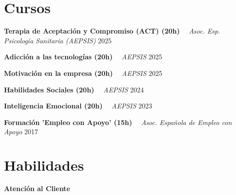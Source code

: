 \documentclass[letterpaper,11pt]{article}
\begin{document}
\section{Cursos}
    \noindent
    \begin{minipage}[t]{1.0\linewidth}
        {\textbf{Terapia de Aceptación y Compromiso (ACT) (20h)}} 
        \ \textendash \ 
        {\color{detailgray}\textit{Asoc. Esp. Psicología Sanitaria (AEPSIS)}}
        \hfill 
        {\small 2025}
    \end{minipage}
    \par 
    \vspace{0.1cm} 
    \noindent
    \begin{minipage}[t]{1.0\linewidth}
        {\textbf{Adicción a las tecnologías (20h)}} 
        \ \textendash \ 
        {\color{detailgray}\textit{AEPSIS}}
        \hfill 
        {\small 2025}
    \end{minipage}
    \par 
    \vspace{0.1cm} 
    \noindent
    \begin{minipage}[t]{1.0\linewidth}
        {\textbf{Motivación en la empresa (20h)}} 
        \ \textendash \ 
        {\color{detailgray}\textit{AEPSIS}}
        \hfill 
        {\small 2025}
    \end{minipage}
    \par 
    \vspace{0.1cm} 
    \noindent
    \begin{minipage}[t]{1.0\linewidth}
        {\textbf{Habilidades Sociales (20h)}} 
        \ \textendash \ 
        {\color{detailgray}\textit{AEPSIS}}
        \hfill 
        {\small 2024}
    \end{minipage}
    \par 
    \vspace{0.1cm} 
    \noindent
    \begin{minipage}[t]{1.0\linewidth}
        {\textbf{Inteligencia Emocional (20h)}} 
        \ \textendash \ 
        {\color{detailgray}\textit{AEPSIS}}
        \hfill 
        {\small 2023}
    \end{minipage}
    \par 
    \vspace{0.1cm} 
    \noindent
    \begin{minipage}[t]{1.0\linewidth}
        {\textbf{Formación 'Empleo con Apoyo' (15h)}} 
        \ \textendash \ 
        {\color{detailgray}\textit{Asoc. Española de Empleo con Apoyo}}
        \hfill 
        {\small 2017}
    \end{minipage}
    \par 
    \vspace{0.1cm} 

\section{Habilidades}
\noindent
    \textbf{Atención al Cliente} 
    
\end{document}
